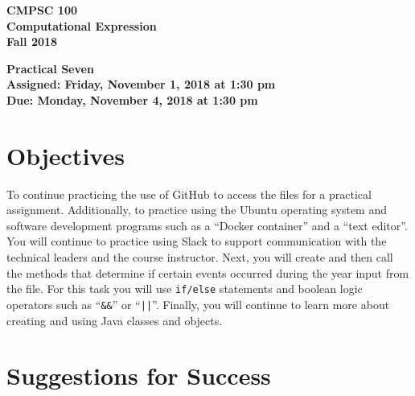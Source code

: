 \documentclass[11pt]{article}
\newcommand{\assignmentduedate}{November 4}
\newcommand{\assignmentassignedate}{November 1}
\newcommand{\assignmentnumber}{Seven}
\newcommand{\labyear}{2018}
\newcommand{\labdueday}{Monday}
\newcommand{\labassignday}{Friday}
\newcommand{\labtime}{1:30 pm}
\newcommand{\assigneddate}{Assigned: \labassignday, \assignmentassignedate, \labyear{} at \labtime{}}
\newcommand{\duedate}{Due: \labdueday, \assignmentduedate, \labyear{} at \labtime{}}
\newcommand{\labtitle}[1]
{
  \begin{center}
    \begin{center}
      \bf
      CMPSC 100\\Computational Expression\\
      Fall 2018\\
      \medskip
    \end{center}
    \bf
    #1
  \end{center}
}
\begin{document}
\thispagestyle{empty}

\labtitle{Practical \assignmentnumber{} \\ \assigneddate{} \\ \duedate{}}

\section*{Objectives}

To continue practicing the use of GitHub to access the files for a practical
assignment. Additionally, to practice using the Ubuntu operating system and
software development programs such as a ``Docker container'' and a ``text
editor''. You will continue to practice using Slack to support communication
with the technical leaders and the course instructor. Next, you will create
and then call the methods that determine if certain events occurred during the
year input from the file. For this task you will use {\tt if/else} statements
and boolean logic operators such as ``{\tt \&\&}'' or ``{\tt ||}''. Finally, you
will continue to learn more about creating and using Java classes and objects.

\section*{Suggestions for Success}
\end{document}
